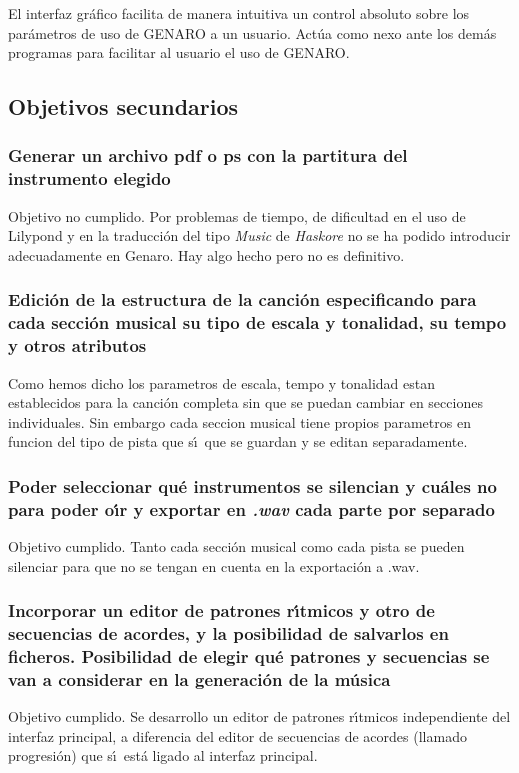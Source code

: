 El interfaz gr\'afico facilita de manera intuitiva un control absoluto sobre los par\'ametros de uso de GENARO a un usuario. Act\'ua como nexo ante los dem\'as programas para facilitar al usuario el uso de GENARO.

\subsection{Objetivos secundarios}

\subsubsection{Generar un archivo pdf o ps con la partitura del instrumento elegido}
Objetivo no cumplido. Por problemas de tiempo, de dificultad en el uso de Lilypond y en la traducci\'on
del tipo \emph{Music} de \emph{Haskore} no se ha podido introducir adecuadamente en Genaro. Hay algo
hecho pero no es definitivo.

\subsubsection{Edici\'on de la estructura de la canci\'on especificando para cada secci\'on musical su tipo de escala y tonalidad, su tempo y otros atributos}
Como hemos dicho los parametros de escala, tempo y tonalidad estan establecidos para la canci\'on completa sin que se puedan cambiar en secciones individuales. Sin embargo cada seccion musical tiene propios parametros en funcion del tipo de pista que s\'\i ~que se guardan y se editan separadamente.

\subsubsection {Poder seleccionar qu\'e instrumentos se silencian y cu\'ales no para poder o\'\i r y exportar en \emph{.wav} cada parte por separado}

Objetivo cumplido. Tanto cada secci\'on musical como cada pista se pueden silenciar para que no se tengan
en cuenta en la exportaci\'on a .wav.

\subsubsection{Incorporar un editor de patrones r\'\i tmicos y otro de secuencias de acordes, y la posibilidad de salvarlos en ficheros. Posibilidad de elegir qu\'e patrones y secuencias se van a considerar en la generaci\'on de la m\'usica}
Objetivo cumplido. Se desarrollo un editor de patrones r\'\i tmicos independiente del interfaz principal, a diferencia del editor de secuencias de acordes (llamado progresi\'on) que s\'\i ~est\'a ligado al interfaz principal.

